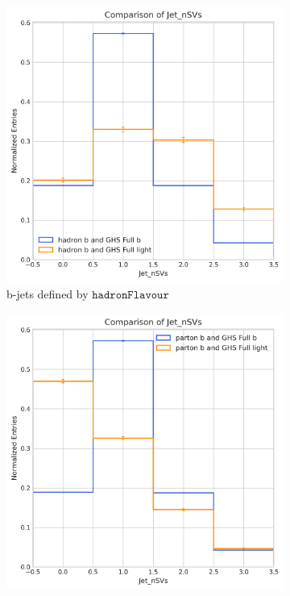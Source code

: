 \documentclass[10pt,twocolumn]{article}
\newcommand*{\hadFlav}{\texttt{hadronFlavour}}
\begin{document}
\begin{figure}[!htbp]
    \centering
    \begin{subfigure}[t]{0.48\textwidth}
        \centering
        \includegraphics[width=\textwidth]{images/compare_nSVs_GHSFull_light_vs_b_filter_hadronFlavour_5.png}
        \caption{b-jets defined by $\hadFlav$}
        \label{fig:jet_nSVs_full_b_hadron_b}
    \end{subfigure}
    \hfill
    \begin{subfigure}[t]{0.48\textwidth}
        \centering
        \includegraphics[width=\textwidth]{images/compare_nSVs_GHSFull_light_vs_b_filter_partonFlavour_5.png}

\end{subfigure}
\end{figure}
\end{document}
